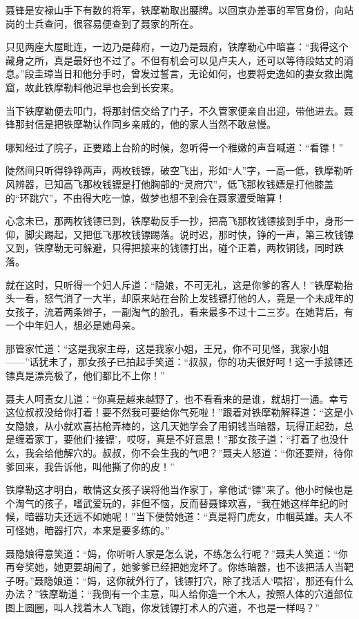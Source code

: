 \documentclass[12pt,oneside]{book}
\begin{document}
聂锋是安禄山手下有数的将军，铁摩勒取出腰牌。以回京办差事的军官身份，向站岗的士兵查问，很容易便查到了聂家的所在。

只见两座大屋毗连，一边乃是薛府，一边乃是聂府，铁摩勒心中暗喜：``我得这个藏身之所，真是最好也不过了。不但有机会可以见卢夫人，还可以等待段姑丈的消息。''段圭璋当日和他分手时，曾发过誓言，无论如何，也要将史逸如的妻女救出魔窟，故此铁摩勒料他迟早也会到长安来。

当下铁摩勒便去叩门，将那封信交给了门子，不久管家便亲自出迎，带他进去。聂锋那封信是把铁摩勒认作同乡亲戚的，他的家人当然不敢怠慢。

哪知经过了院子，正要踏上台阶的时候，忽听得一个稚嫩的声音喊道：``看镖！''

陡然间只听得铮铮两声，两枚钱镖，破空飞出，形如``人''字，一高一低，铁摩勒听风辨器，已知高飞那枚钱镖是打他胸部的``灵府穴''，低飞那枚钱嫖是打他膝盖的``环跳穴''，不由得大吃一惊，做梦也想不到会在聂家遭受暗算！

心念未已，那两枚钱镖已到，铁摩勒反手一抄，把高飞那枚钱镖接到手中，身形一仰，脚尖踢起，又把低飞那枚钱镖踢落。说时迟，那时快，铮的一声，第三枚钱镖又到，铁摩勒无可躲避，只得把接来的钱镖打出，碰个正着，两枚铜钱，同时跌落。

就在这时，只听得一个妇人斥道：``隐娘，不可无礼，这是你爹的客人！''铁摩勒抬头一看，怒气消了一大半，却原来站在台阶上发钱镖打他的人，竟是一个未成年的女孩子，流着两条辫子，一副淘气的脸孔，看来最多不过十二三岁。在她背后，有一个中年妇人，想必是她母亲。

那管家忙道：``这是我家主母，这是我家小姐，王兄，你不可见怪，我家小姐------''话犹未了，那女孩子已拍起手笑道：``叔叔，你的功夫很好呵！这一手接镖还镖真是漂亮极了，他们都比不上你！''

聂夫人呵责女儿道：``你真是越来越野了，也不看看来的是谁，就胡打一通。幸亏这位叔叔没给你打着！要不然我可要给你气死啦！''跟着对铁摩勒解释道：``这是小女隐娘，从小就欢喜拈枪弄棒的，这几天她学会了用铜钱当暗器，玩得正起劲，总是缠着家丁，要他们`接镖'，哎呀，真是不好意思！''那女孩子道：``打着了也没什么，我会给他解穴的。叔叔，你不会生我的气吧？''聂夫人怒道：``你还要辩，待你爹回来，我告诉他，叫他撕了你的皮！''

铁摩勒这才明白，敢情这女孩子误将他当作家丁，拿他试``镖''来了。他小时候也是个淘气的孩子，嗜武爱玩的，非但不恼，反而替聂锋欢喜，``我在她这样年纪的时候，暗器功夫还远不如她呢！''当下便赞她道：``真是将门虎女，巾帼英雄。夫人不可怪她，暗器打穴，本来是要多练的。''

聂隐娘得意笑道：``妈，你听听人家是怎么说，不练怎么行呢？''聂夫人笑道：``你再夸奖她，她更要胡闹了，她爹爹已经把她宠坏了。你练暗器，也不该把活人当靶子呀。''聂隐娘道：``妈，这你就外行了，钱镖打穴，除了找活人`喂招'，那还有什么办法？''铁摩勒道：``我倒有一个主意，叫人给你造一个木人，按照人体的穴道部位图上圆圈，叫人找着木人飞跑，你发钱镖打术人的穴道，不也是一样吗？''
\end{document}
